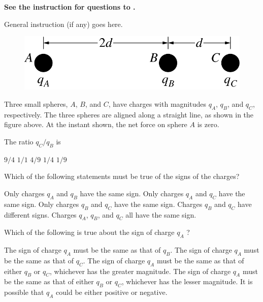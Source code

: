 \textbf{See the instruction for questions  to .}

General instruction (if any) goes here.

\begin{figure}[H]
\centering
\includegraphics[scale=0.3]{images/img-010-017.png}
\end{figure}

Three small spheres, $A$, $B$, and $C$, have charges with magnitudes $q_{A}$, $q_{B}$, and $q_{C}$, respectively. The three spheres are aligned along a straight line, as shown in the figure above. At the instant shown, the net force on sphere $A$ is zero.

\begin{questions}\setcounter{question}{19}\question
The ratio $q_{C} / q_{B}$ is

\begin{oneparchoices}
\choice $9 / 4$
\choice $1 / 1$
\choice $4 / 9$
\choice $1 / 4$
\choice $1 / 9$
\end{oneparchoices}\end{questions}

\begin{questions}\setcounter{question}{20}\question
Which of the following statements must be true of the signs of the charges?

\begin{choices}
\choice Only charges $q_{A}$ and $q_{B}$ have the same sign.
\choice Only charges $q_{A}$ and $q_{C}$ have the same sign.
\choice Only charges $q_{B}$ and $q_{C}$ have the same sign.
\choice Charges $q_{B}$ and $q_{C}$ have different signs.
\choice Charges $q_{A}$, $q_{B}$, and $q_{C}$ all have the same sign.
\end{choices}\end{questions}

\begin{questions}\setcounter{question}{21}\question
Which of the following is true about the sign of charge $q_{A}$ ?

\begin{choices}
\choice The sign of charge $q_{A}$ must be the same as that of $q_{B}$.
\choice The sign of charge $q_{A}$ must be the same as that of $q_{C}$.
\choice The sign of charge $q_{A}$ must be the same as that of either $q_{B}$ or $q_{C}$, whichever has the greater magnitude.
\choice The sign of charge $q_{A}$ must be the same as that of either $q_{B}$ or $q_{C}$, whichever has the lesser magnitude.
\choice It is possible that $q_{A}$ could be either positive or negative.
\end{choices}\end{questions}

